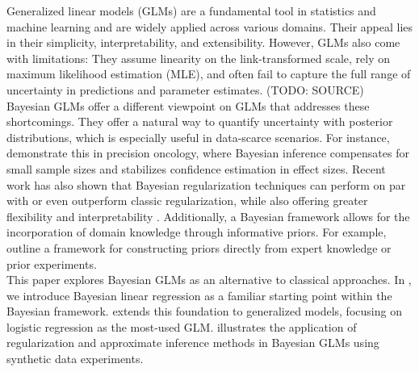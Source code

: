 Generalized linear models (GLMs) are a fundamental tool in statistics and machine learning and are widely applied across various domains.
Their appeal lies in their simplicity, interpretability, and extensibility.
However, GLMs also come with limitations:
They assume linearity on the link-transformed scale, rely on maximum likelihood estimation (MLE), and often fail to capture the full range of uncertainty in predictions and parameter estimates. (TODO: SOURCE)\\

Bayesian GLMs offer a different viewpoint on GLMs that addresses these shortcomings.
They offer a natural way to quantify uncertainty with posterior distributions, which is especially useful in data-scarce scenarios.
For instance, \citet{sondhi_bayesian_2021} demonstrate this in precision oncology, where Bayesian inference compensates for small sample sizes and stabilizes confidence estimation in effect sizes.
Recent work has also shown that Bayesian regularization techniques can perform on par with or even outperform classic regularization, while also offering greater flexibility and interpretability \citep[see e.g.][]{van_erp_shrinkage_2019,celeux_regularization_2012}.
Additionally, a Bayesian framework allows for the incorporation of domain knowledge through informative priors.
For example, \citet{chien_informative_2023} outline a framework for constructing priors directly from expert knowledge or prior experiments.\\

This paper explores Bayesian GLMs as an alternative to classical approaches.
In , we introduce Bayesian linear regression as a familiar starting point within the Bayesian framework.
 extends this foundation to generalized models, focusing on logistic regression as the most-used GLM.
 illustrates the application of regularization and approximate inference methods in Bayesian GLMs using synthetic data experiments.\\



